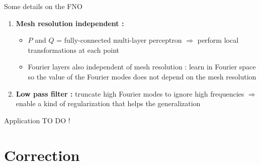 \documentclass[compress,10pt,xcolor={table,dvipsnames},t]{beamer}
\begin{document}
	\begin{frame}{Some details on the FNO}
		\begin{enumerate}[\ding{217}]
			\item \textbf{Mesh resolution independent : }
			\begin{itemize}
				\item $P$ and $Q$ = fully-connected multi-layer perceptron $\Rightarrow$ perform local transformations at each point
				\item Fourier layers also independent of mesh resolution : learn in Fourier space so the value of the Fourier modes does not depend on the mesh resolution
			\end{itemize}
			\item \textbf{Low pass filter :} truncate high Fourier modes to ignore high frequencies $\Rightarrow$ enable a kind of regularization that helps the generalization
			\begin{center}
			\end{center}
		\end{enumerate}		
	\end{frame}

	\begin{frame}{Application}
		TO DO !
	\end{frame}
	
	\section{Correction}
	
\end{document}
